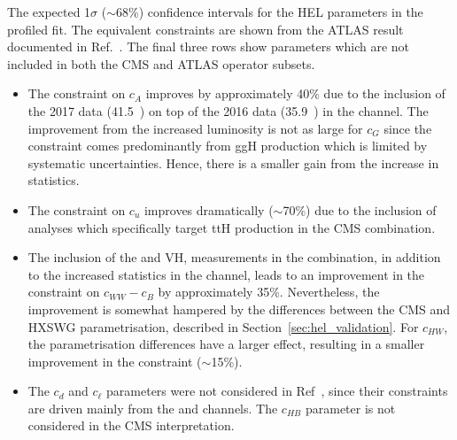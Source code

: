 \begin{table}
  \centering
  \renewcommand{\arraystretch}{1.3}
  \setlength{\tabcolsep}{15pt}
  \caption[Comparison to the HEL parameter constraints from a previous ATLAS result]
  {
    The expected 1$\sigma$ ($\sim$68\%) confidence intervals for the HEL parameters in the profiled fit. The equivalent constraints are shown from the ATLAS result documented in Ref.~\cite{ATL-PHYS-PUB-2017-018}. The final three rows show parameters which are not included in both the CMS and ATLAS operator subsets.
  }
  \label{tab:hel_atlas}
  
\end{table}

\begin{itemize}
    \item The constraint on $c_A$ improves by approximately 40\% due to the inclusion of the 2017 data (41.5~\fbinv) on top of the 2016 data (35.9~\fbinv) in the \Hgg channel. The improvement from the increased luminosity is not as large for $c_G$ since the constraint comes predominantly from ggH production which is limited by systematic uncertainties. Hence, there is a smaller gain from the increase in statistics.
    \item The constraint on $c_u$ improves dramatically ($\sim$70\%) due to the inclusion of analyses which specifically target ttH production in the CMS combination. 
    \item The inclusion of the \HWW and VH, \Hbb measurements in the combination, in addition to the increased statistics in the \Hfl channel, leads to an improvement in the constraint on $c_{WW}-c_B$ by approximately 35\%. Nevertheless, the improvement is somewhat hampered by the differences between the CMS and HXSWG parametrisation, described in Section~\ref{sec:hel_validation}. For $c_{HW}$, the parametrisation differences have a larger effect, resulting in a smaller improvement in the constraint ($\sim$15\%).
    \item The $c_d$ and $c_\ell$ parameters were not considered in Ref~\cite{ATL-PHYS-PUB-2017-018}, since their constraints are driven mainly from the \Hbb and \Htautau channels. The $c_{HB}$ parameter is not considered in the CMS interpretation.
\end{itemize}

